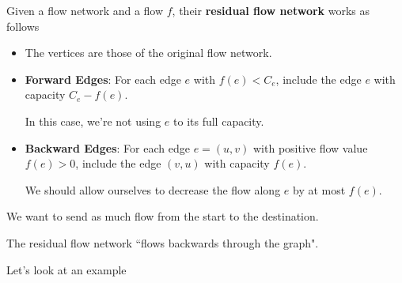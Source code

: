 \documentclass[12pt]{article}
\begin{document}
   {
    Given a flow network and a flow $f$, their {\bf residual flow network} works as
    follows

    \begin{itemize}
      \item The vertices are those of the original flow network.

      \item {\bf Forward Edges}: For each edge $e$ with $f(e) < C_e$, include
        the edge $e$ with capacity $C_e - f(e)$.

        In this case, we're not using $e$ to its full capacity.

      \item {\bf Backward Edges}: For each edge $e = (u, v)$ with positive flow
        value $f(e) > 0$, include the edge $(v, u)$ with capacity $f(e)$.

        We should allow ourselves to decrease the flow along $e$ by at most
        $f(e)$.
    \end{itemize}
  }


  We want to send as much flow from the start to the destination.

  The residual flow network ``flows backwards through the graph".

  Let's look at an example
\end{document}
